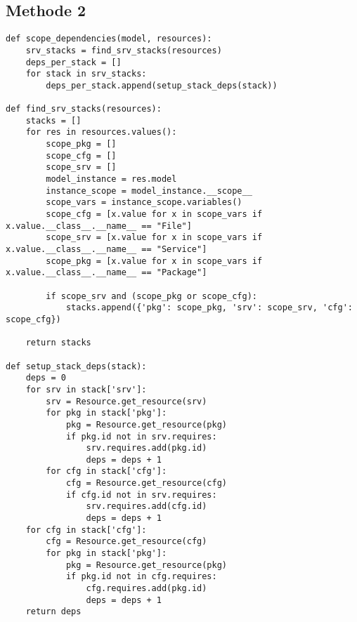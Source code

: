 \subsection{Methode 2}
\begin{minipage}{\textwidth}
\begin{lstlisting}
def scope_dependencies(model, resources):
    srv_stacks = find_srv_stacks(resources)
    deps_per_stack = [] 
    for stack in srv_stacks:
        deps_per_stack.append(setup_stack_deps(stack))
 
def find_srv_stacks(resources):
    stacks = []
    for res in resources.values():
        scope_pkg = []
        scope_cfg = []
        scope_srv = []
        model_instance = res.model
        instance_scope = model_instance.__scope__
        scope_vars = instance_scope.variables()
        scope_cfg = [x.value for x in scope_vars if x.value.__class__.__name__ == "File"]
        scope_srv = [x.value for x in scope_vars if x.value.__class__.__name__ == "Service"]
        scope_pkg = [x.value for x in scope_vars if x.value.__class__.__name__ == "Package"]
 
        if scope_srv and (scope_pkg or scope_cfg):
            stacks.append({'pkg': scope_pkg, 'srv': scope_srv, 'cfg': scope_cfg})
 
    return stacks
 
def setup_stack_deps(stack):
    deps = 0
    for srv in stack['srv']:
        srv = Resource.get_resource(srv)
        for pkg in stack['pkg']:
            pkg = Resource.get_resource(pkg)
            if pkg.id not in srv.requires:
                srv.requires.add(pkg.id)
                deps = deps + 1
        for cfg in stack['cfg']:
            cfg = Resource.get_resource(cfg)
            if cfg.id not in srv.requires:
                srv.requires.add(cfg.id)
                deps = deps + 1
    for cfg in stack['cfg']:
        cfg = Resource.get_resource(cfg)
        for pkg in stack['pkg']:
            pkg = Resource.get_resource(pkg)
            if pkg.id not in cfg.requires:
                cfg.requires.add(pkg.id)
                deps = deps + 1
    return deps

\end{lstlisting}
\end{minipage}

